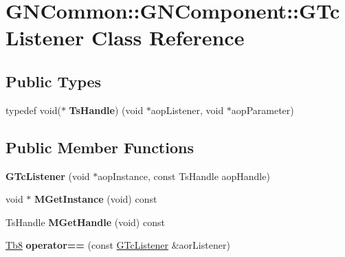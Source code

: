 \hypertarget{class_g_n_common_1_1_g_n_component_1_1_g_tc_listener}{}\section{G\+N\+Common\+:\+:G\+N\+Component\+:\+:G\+Tc\+Listener Class Reference}
\label{class_g_n_common_1_1_g_n_component_1_1_g_tc_listener}
\subsection*{Public Types}
\begin{DoxyCompactItemize}
\item 
\mbox{\label{class_g_n_common_1_1_g_n_component_1_1_g_tc_listener_adf19db174a959816cee729302eda1faf}} 
typedef void($\ast$ {\bfseries Ts\+Handle}) (void $\ast$aop\+Listener, void $\ast$aop\+Parameter)
\end{DoxyCompactItemize}
\subsection*{Public Member Functions}
\begin{DoxyCompactItemize}
\item 
\mbox{\label{class_g_n_common_1_1_g_n_component_1_1_g_tc_listener_aefc63ad4c7dc623de5c9c156848774ce}} 
{\bfseries G\+Tc\+Listener} (void $\ast$aop\+Instance, const Ts\+Handle aop\+Handle)
\item 
\mbox{\label{class_g_n_common_1_1_g_n_component_1_1_g_tc_listener_aa7b293fa2d8fb08c31b9953557ead0c8}} 
void $\ast$ {\bfseries M\+Get\+Instance} (void) const
\item 
\mbox{\label{class_g_n_common_1_1_g_n_component_1_1_g_tc_listener_a401b10e5fb60ecb19c6808ba5f758674}} 
Ts\+Handle {\bfseries M\+Get\+Handle} (void) const
\item 
\mbox{\label{class_g_n_common_1_1_g_n_component_1_1_g_tc_listener_a4ae45f5ca3166a6cef67177b22ee478a}} 
\mbox{\hyperlink{namespace_g_n_common_a8115dc7ed53b6e5b52e6bfde1632ea74}{Tb8}} {\bfseries operator==} (const \mbox{\hyperlink{class_g_n_common_1_1_g_n_component_1_1_g_tc_listener}{G\+Tc\+Listener}} \&aor\+Listener)
\end{DoxyCompactItemize}
